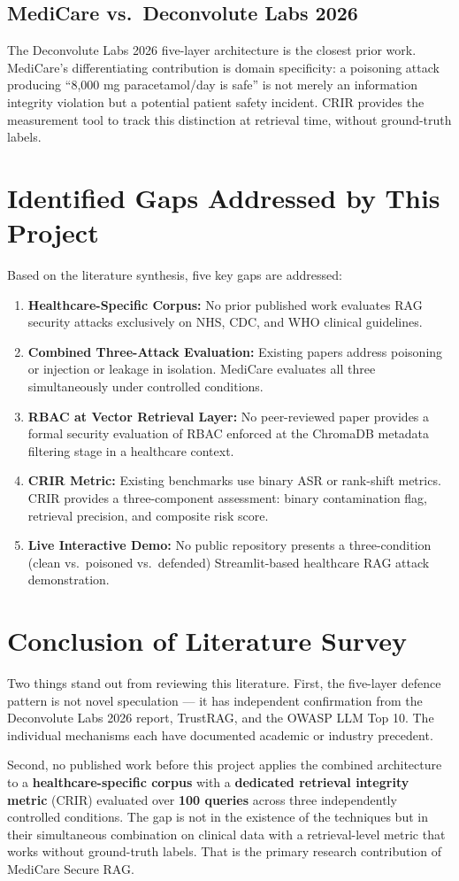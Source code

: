 \subsection{MediCare vs.\ Deconvolute Labs 2026}
The Deconvolute Labs 2026 five-layer architecture is the closest prior work. MediCare's differentiating contribution is domain specificity: a poisoning attack producing ``8,000 mg paracetamol/day is safe'' is not merely an information integrity violation but a potential patient safety incident. CRIR provides the measurement tool to track this distinction at retrieval time, without ground-truth labels.

\section{Identified Gaps Addressed by This Project}

Based on the literature synthesis, five key gaps are addressed:
\begin{enumerate}
    \item \textbf{Healthcare-Specific Corpus:} No prior published work evaluates RAG security attacks exclusively on NHS, CDC, and WHO clinical guidelines.
    \item \textbf{Combined Three-Attack Evaluation:} Existing papers address poisoning or injection or leakage in isolation. MediCare evaluates all three simultaneously under controlled conditions.
    \item \textbf{RBAC at Vector Retrieval Layer:} No peer-reviewed paper provides a formal security evaluation of RBAC enforced at the ChromaDB metadata filtering stage in a healthcare context.
    \item \textbf{CRIR Metric:} Existing benchmarks use binary ASR or rank-shift metrics. CRIR provides a three-component assessment: binary contamination flag, retrieval precision, and composite risk score.
    \item \textbf{Live Interactive Demo:} No public repository presents a three-condition (clean vs.~poisoned vs.~defended) Streamlit-based healthcare RAG attack demonstration.
\end{enumerate}

\section{Conclusion of Literature Survey}

Two things stand out from reviewing this literature. First, the five-layer defence pattern is not novel speculation --- it has independent confirmation from the Deconvolute Labs 2026 report, TrustRAG, and the OWASP LLM Top 10. The individual mechanisms each have documented academic or industry precedent.

Second, no published work before this project applies the combined architecture to a \textbf{healthcare-specific corpus} with a \textbf{dedicated retrieval integrity metric} (CRIR) evaluated over \textbf{100 queries} across three independently controlled conditions. The gap is not in the existence of the techniques but in their simultaneous combination on clinical data with a retrieval-level metric that works without ground-truth labels. That is the primary research contribution of MediCare Secure RAG.

